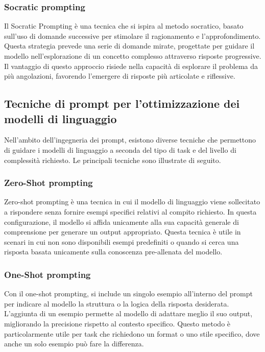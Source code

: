 \documentclass[target=mst,aauheader=,style=]{thud}
\begin{document}
\subsubsection{Socratic prompting}
Il Socratic Prompting è una tecnica che si ispira al metodo socratico, basato sull'uso di domande successive per stimolare il ragionamento e l’approfondimento. Questa strategia prevede una serie di domande mirate, progettate per guidare il modello nell’esplorazione di un concetto complesso attraverso risposte progressive. Il vantaggio di questo approccio risiede nella capacità di esplorare il problema da più angolazioni, favorendo l’emergere di risposte più articolate e riflessive.

\subsection{Tecniche di prompt per l'ottimizzazione dei modelli di linguaggio}
Nell’ambito dell’ingegneria dei prompt, esistono diverse tecniche che permettono di guidare i modelli di linguaggio a seconda del tipo di task e del livello di complessità richiesto. Le principali tecniche sono illustrate di seguito.\cite{sahoo_2024}

\subsubsection{Zero-Shot prompting}
Zero-shot prompting è una tecnica in cui il modello di linguaggio viene sollecitato a rispondere senza fornire esempi specifici relativi al compito richiesto. In questa configurazione, il modello si affida unicamente alla sua capacità generale di comprensione per generare un output appropriato. Questa tecnica è utile in scenari in cui non sono disponibili esempi predefiniti o quando si cerca una risposta basata unicamente sulla conoscenza pre-allenata del modello.

\subsubsection{One-Shot prompting}
Con il one-shot prompting, si include un singolo esempio all’interno del prompt per indicare al modello la struttura o la logica della risposta desiderata. L’aggiunta di un esempio permette al modello di adattare meglio il suo output, migliorando la precisione rispetto al contesto specifico. Questo metodo è particolarmente utile per task che richiedono un format o uno stile specifico, dove anche un solo esempio può fare la differenza.
\end{document}

